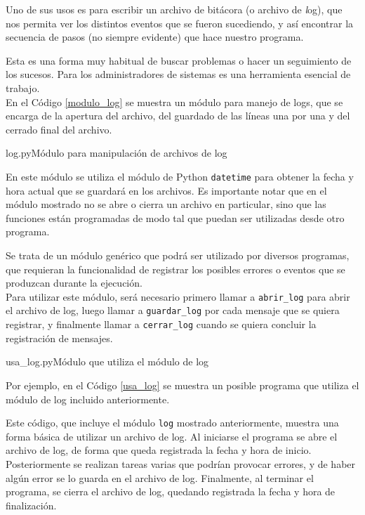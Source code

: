 Uno de sus usos es para escribir un archivo de bitácora (o archivo de
{\textit log}), que nos permita ver los distintos eventos que se fueron
sucediendo, y así encontrar la secuencia de pasos (no siempre evidente) que
hace nuestro programa.

Esta es una forma muy habitual de buscar problemas o hacer un seguimiento
de los sucesos. Para los administradores de sistemas es una herramienta
esencial de trabajo. \\

En el Código \ref{modulo_log} se muestra un módulo para manejo de logs, que
se encarga de la apertura del archivo, del guardado de las líneas una por
una y del cerrado final del archivo.

\begin{codigo}{log.py}{Módulo para manipulación de archivos de log}
\label{modulo_log}

\end{codigo}

En este módulo se utiliza el módulo de Python \lstinline!datetime! para
obtener la fecha y hora actual que se guardará en los archivos.  Es
importante notar que en el módulo mostrado no se abre o cierra un archivo
en particular, sino que las funciones están programadas de modo tal que
puedan ser utilizadas desde otro programa. 

Se trata de un módulo genérico que podrá ser utilizado por diversos programas,
que requieran la funcionalidad de registrar los posibles errores o eventos que
se produzcan durante la ejecución. \\

Para utilizar este módulo, será necesario primero llamar a
\lstinline!abrir_log! para abrir el archivo de log, luego llamar a
\lstinline!guardar_log! por cada mensaje que se quiera registrar, y
finalmente llamar a \lstinline!cerrar_log! cuando se quiera concluir la
registración de mensajes. \\

\begin{codigo}{usa\_log.py}{Módulo que utiliza el módulo de log}
\label{usa_log}

\end{codigo}

Por ejemplo, en el Código \ref{usa_log} se muestra un posible programa que
utiliza el módulo de log incluido anteriormente.

Este código, que incluye el módulo \lstinline!log! mostrado anteriormente,
muestra una forma básica de utilizar un archivo de log.  Al iniciarse el
programa se abre el archivo de log, de forma que queda registrada la fecha
y hora de inicio.  Posteriormente se realizan tareas varias que podrían
provocar errores, y de haber algún error se lo guarda en el archivo de log.
Finalmente, al terminar el programa, se cierra el archivo de log, quedando
registrada la fecha y hora de finalización.

